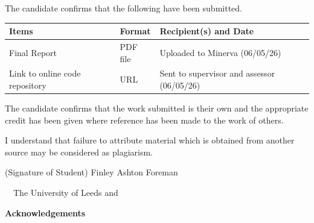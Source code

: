 \frontcover

\clearpage

\noindent The candidate confirms that the following have been submitted.\\


\begin{table}[ht!]
\begin{tabular}{|p{}|p{}|p{}|}
\hline 
Items & Format & Recipient(s) and Date \\ 
\hline 
Final Report & PDF file & Uploaded to Minerva (06/05/26) \\  
\hline 
Link to online code repository & URL & Sent to supervisor and assessor (06/05/26) \\ 
\hline 
\end{tabular} 
\end{table}


\vfill

\noindent The candidate confirms that the work submitted is their own and the appropriate credit has been given where reference has been made to the work of others.

\vfill

\noindent I understand that failure to attribute material which is obtained from another source may be considered as plagiarism.

\vfill

\flushright(Signature of Student) Finley Ashton Foreman
\flushleft

\vfill

\textcopyright~\session~The University of Leeds and~\fullname

\begin{dissertationsummary}

\end{dissertationsummary}

\clearpage
\centering\textbf{Acknowledgements}
\flushleft


\tableofcontents

\clearpage

